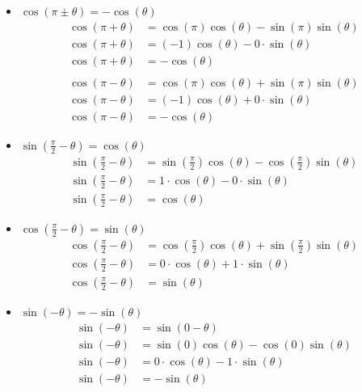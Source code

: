 \documentclass[12pt]{article}
\begin{document}
\begin{itemize}
    \item $\cos(\pi \pm \theta) = -\cos(\theta)$
        \begin{align*}
            \cos(\pi + \theta) &= \cos(\pi)\cos(\theta) - \sin(\pi)\sin(\theta) \\
            \cos(\pi + \theta) &= (-1)\cos(\theta) - 0 \cdot \sin(\theta) \\
            \cos(\pi + \theta) &= -\cos(\theta) \tag*{$\square$} \\ \\
            \cos(\pi - \theta) &= \cos(\pi)\cos(\theta) + \sin(\pi)\sin(\theta) \\
            \cos(\pi - \theta) &= (-1)\cos(\theta) + 0 \cdot \sin(\theta) \\
            \cos(\pi - \theta) &= -\cos(\theta)  \tag*{$\square$}
        \end{align*}

    \item $\sin(\frac{\pi}{2} - \theta) = \cos(\theta)$
        \begin{align*}
            \sin\left(\frac{\pi}{2} - \theta\right) &= \sin\left(\frac{\pi}{2}\right)\cos(\theta) - \cos\left(\frac{\pi}{2}\right)\sin(\theta) \\
            \sin\left(\frac{\pi}{2} - \theta\right) &= 1 \cdot \cos(\theta) - 0 \cdot \sin(\theta) \\
            \sin\left(\frac{\pi}{2} - \theta\right) &= \cos(\theta)  \tag*{$\square$}
        \end{align*}

    \item $\cos(\frac{\pi}{2} - \theta) = \sin(\theta)$
        \begin{align*}
            \cos\left(\frac{\pi}{2} - \theta\right) &= \cos\left(\frac{\pi}{2}\right)\cos(\theta) + \sin\left(\frac{\pi}{2}\right)\sin(\theta) \\
            \cos\left(\frac{\pi}{2} - \theta\right) &= 0 \cdot \cos(\theta) + 1 \cdot \sin(\theta) \\
            \cos\left(\frac{\pi}{2} - \theta\right) &= \sin(\theta)  \tag*{$\square$}
        \end{align*}

    \item $\sin(- \theta) = -\sin(\theta)$
        \begin{align*}
            \sin(-\theta) &= \sin(0 - \theta) \\
            \sin(-\theta) &= \sin(0)\cos(\theta) - \cos(0)\sin(\theta) \\
            \sin(-\theta) &= 0 \cdot \cos(\theta) - 1 \cdot \sin(\theta) \\
            \sin(-\theta) &= -\sin(\theta)  \tag*{$\square$}
        \end{align*}


\end{itemize}
\end{document}
